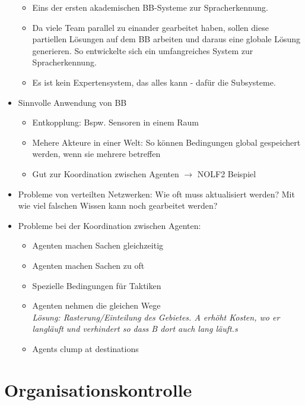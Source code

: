 \documentclass{article} %
\begin{document}
\begin{itemize}
			\begin{itemize}
			\item Eins der ersten akademischen BB-Systeme zur Spracherkennung. 
			\item Da viele Team parallel zu einander gearbeitet haben, sollen diese partiellen Lösungen auf dem BB arbeiten und daraus eine globale Lösung generieren. So entwickelte sich ein umfangreiches System zur Spracherkennung.
			\item Es ist kein Expertensystem, das alles kann - dafür die Subsysteme.
			\end{itemize}
		\item Sinnvolle Anwendung von BB
			\begin{itemize}
			\item Entkopplung: Bspw. Sensoren in einem Raum
			\item Mehere Akteure in einer Welt: So können Bedingungen global gespeichert werden, wenn sie mehrere betreffen
			\item Gut zur Koordination zwischen Agenten $\rightarrow$ NOLF2 Beispiel
			\end{itemize}
		\item Probleme von verteilten Netzwerken: Wie oft muss aktualisiert werden? Mit wie viel falschen Wissen kann noch gearbeitet werden?
		\item Probleme bei der Koordination zwischen Agenten:
			\begin{itemize}
			\item Agenten machen Sachen gleichzeitig
			\item Agenten machen Sachen zu oft
			\item Spezielle Bedingungen für Taktiken
			\item Agenten nehmen die gleichen Wege\\
			\textit{Lösung: Rasterung/Einteilung des Gebietes. A erhöht Kosten, wo er langläuft und verhindert so dass B dort auch lang läuft.s}
			\item Agents clump at destinations
			\end{itemize}
	\end{itemize}
	\section{Organisationskontrolle}
\end{document}
